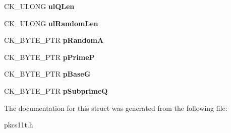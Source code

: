 \begin{DoxyCompactItemize}
\item 
\mbox{\label{struct_c_k___s_k_i_p_j_a_c_k___p_r_i_v_a_t_e___w_r_a_p___p_a_r_a_m_s_a15e8b5788e371e4b4e6e0676101be7fa}} 
C\+K\+\_\+\+U\+L\+O\+NG {\bfseries ul\+Q\+Len}
\item 
\mbox{\label{struct_c_k___s_k_i_p_j_a_c_k___p_r_i_v_a_t_e___w_r_a_p___p_a_r_a_m_s_aef961ec9cc230498bbd6524f3d280d72}} 
C\+K\+\_\+\+U\+L\+O\+NG {\bfseries ul\+Random\+Len}
\item 
\mbox{\label{struct_c_k___s_k_i_p_j_a_c_k___p_r_i_v_a_t_e___w_r_a_p___p_a_r_a_m_s_aecf7dc559fa0698e185e16f0f3eda3c9}} 
C\+K\+\_\+\+B\+Y\+T\+E\+\_\+\+P\+TR {\bfseries p\+RandomA}
\item 
\mbox{\label{struct_c_k___s_k_i_p_j_a_c_k___p_r_i_v_a_t_e___w_r_a_p___p_a_r_a_m_s_ab3529baced3561dfdbf016ff59f9c3bf}} 
C\+K\+\_\+\+B\+Y\+T\+E\+\_\+\+P\+TR {\bfseries p\+PrimeP}
\item 
\mbox{\label{struct_c_k___s_k_i_p_j_a_c_k___p_r_i_v_a_t_e___w_r_a_p___p_a_r_a_m_s_a465420717f684f591fc9b1baec860528}} 
C\+K\+\_\+\+B\+Y\+T\+E\+\_\+\+P\+TR {\bfseries p\+BaseG}
\item 
\mbox{\label{struct_c_k___s_k_i_p_j_a_c_k___p_r_i_v_a_t_e___w_r_a_p___p_a_r_a_m_s_ae1a258ddf445abd2b00627f063eba7b3}} 
C\+K\+\_\+\+B\+Y\+T\+E\+\_\+\+P\+TR {\bfseries p\+SubprimeQ}
\end{DoxyCompactItemize}


The documentation for this struct was generated from the following file\+:\begin{DoxyCompactItemize}
\item 
pkcs11t.\+h\end{DoxyCompactItemize}
